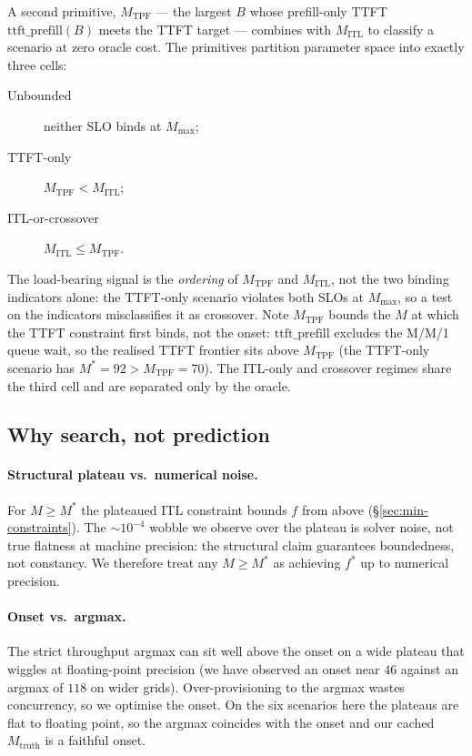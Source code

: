 A second primitive, $M_{\mathrm{TPF}}$ --- the largest $B$ whose prefill-only TTFT
$\mathrm{ttft\_prefill}(B)$ meets the TTFT target --- combines with $M_{\mathrm{ITL}}$ to
classify a scenario at zero oracle cost. The primitives partition parameter space into
exactly three cells:
\begin{description}
  \item[Unbounded] neither SLO binds at $M_{\max}$;
  \item[TTFT-only] $M_{\mathrm{TPF}} < M_{\mathrm{ITL}}$;
  \item[ITL-or-crossover] $M_{\mathrm{ITL}} \le M_{\mathrm{TPF}}$.
\end{description}
The load-bearing signal is the \emph{ordering} of $M_{\mathrm{TPF}}$ and
$M_{\mathrm{ITL}}$, not the two binding indicators alone: the TTFT-only scenario violates
both SLOs at $M_{\max}$, so a test on the indicators misclassifies it as crossover.
Note $M_{\mathrm{TPF}}$ bounds the $M$ at which the TTFT constraint first binds, not the
onset: $\mathrm{ttft\_prefill}$ excludes the M/M/1 queue wait, so the realised TTFT
frontier sits above $M_{\mathrm{TPF}}$ (the TTFT-only scenario has $M^\ast = 92 >
M_{\mathrm{TPF}} = 70$). The ITL-only and crossover regimes share the third cell and are
separated only by the oracle.

\subsection{Why search, not prediction}
\label{sec:search}

\paragraph{Structural plateau vs.\ numerical noise.}
For $M \ge M^\ast$ the plateaued ITL constraint bounds $f$ from above
(\S\ref{sec:min-constraints}). The $\sim\!10^{-4}$ wobble we observe over the plateau is
solver noise, not true flatness at machine precision: the structural claim guarantees
boundedness, not constancy. We therefore treat any $M \ge M^\ast$ as achieving $f^\ast$
up to numerical precision.

\paragraph{Onset vs.\ argmax.}
The strict throughput argmax can sit well above the onset on a wide plateau that wiggles
at floating-point precision (we have observed an onset near $46$ against an argmax of
$118$ on wider grids). Over-provisioning to the argmax wastes concurrency, so we optimise
the onset. On the six scenarios here the plateaus are flat to floating point, so the
argmax coincides with the onset and our cached $M_{\text{truth}}$ is a faithful onset.

